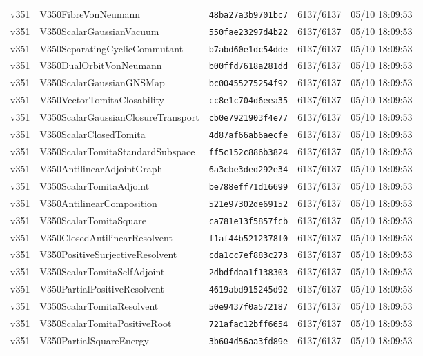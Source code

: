 \documentclass[11pt]{article}
\theoremstyle{definition}\newtheorem{deriv}{Derivation}
\begin{document}
{\begin{longtable}{@{}lllll@{}}
v351 & V350FibreVonNeumann & \texttt{48ba27a3b9701bc7} & 6137/6137 & 05/10 18:09:53 \\
v351 & V350ScalarGaussianVacuum & \texttt{550fae23297d4b22} & 6137/6137 & 05/10 18:09:53 \\
v351 & V350SeparatingCyclicCommutant & \texttt{b7abd60e1dc54dde} & 6137/6137 & 05/10 18:09:53 \\
v351 & V350DualOrbitVonNeumann & \texttt{b00ffd7618a281dd} & 6137/6137 & 05/10 18:09:53 \\
v351 & V350ScalarGaussianGNSMap & \texttt{bc00455275254f92} & 6137/6137 & 05/10 18:09:53 \\
v351 & V350VectorTomitaClosability & \texttt{cc8e1c704d6eea35} & 6137/6137 & 05/10 18:09:53 \\
v351 & V350ScalarGaussianClosureTransport & \texttt{cb0e7921903f4e77} & 6137/6137 & 05/10 18:09:53 \\
v351 & V350ScalarClosedTomita & \texttt{4d87af66ab6aecfe} & 6137/6137 & 05/10 18:09:53 \\
v351 & V350ScalarTomitaStandardSubspace & \texttt{ff5c152c886b3824} & 6137/6137 & 05/10 18:09:53 \\
v351 & V350AntilinearAdjointGraph & \texttt{6a3cbe3ded292e34} & 6137/6137 & 05/10 18:09:53 \\
v351 & V350ScalarTomitaAdjoint & \texttt{be788eff71d16699} & 6137/6137 & 05/10 18:09:53 \\
v351 & V350AntilinearComposition & \texttt{521e97302de69152} & 6137/6137 & 05/10 18:09:53 \\
v351 & V350ScalarTomitaSquare & \texttt{ca781e13f5857fcb} & 6137/6137 & 05/10 18:09:53 \\
v351 & V350ClosedAntilinearResolvent & \texttt{f1af44b5212378f0} & 6137/6137 & 05/10 18:09:53 \\
v351 & V350PositiveSurjectiveResolvent & \texttt{cda1cc7ef883c273} & 6137/6137 & 05/10 18:09:53 \\
v351 & V350ScalarTomitaSelfAdjoint & \texttt{2dbdfdaa1f138303} & 6137/6137 & 05/10 18:09:53 \\
v351 & V350PartialPositiveResolvent & \texttt{4619abd915245d92} & 6137/6137 & 05/10 18:09:53 \\
v351 & V350ScalarTomitaResolvent & \texttt{50e9437f0a572187} & 6137/6137 & 05/10 18:09:53 \\
v351 & V350ScalarTomitaPositiveRoot & \texttt{721afac12bff6654} & 6137/6137 & 05/10 18:09:53 \\
v351 & V350PartialSquareEnergy & \texttt{3b604d56aa3fd89e} & 6137/6137 & 05/10 18:09:53 \\

\end{longtable}}
\end{document}
